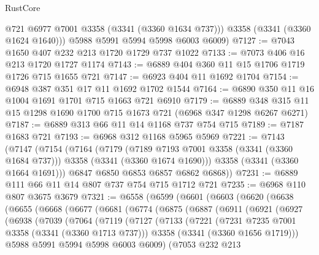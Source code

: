 \begin{lexlean}{RustCore}
\begin{coremodule}
          @721
          @6977
          @7001
          @3358
          (@3341 (@3360 @1634 @737)))
        @3358
        (@3341 (@3360 @1624 @1640)))
      @5988
      @5991
      @5994
      @5998
      @6003
      @6009)
@7127 := @7043 @1650 @407 @232 @213 @1720 @1729 @737 @1022
@7133 := @7073 @406 @16 @213 @1720 @1727 @1174
@7143 := @6889 @404 @360 @11 @15 @1706 @1719 @1726 @715 @1655 @721
@7147 := @6923 @404 @11 @1692 @1704
@7154 := @6948 @387 @351 @17 @11 @1692 @1702 @1544
@7164 := @6890 @350 @11 @16 @1004 @1691 @1701 @715 @1663 @721 @6910
@7179 := @6889 @348 @315 @11 @15 @1298 @1690 @1700 @715 @1673 @721 (@6968 @347 @1298 @6267 @6271)
@7187 := @6889 @313 @66 @11 @14 @1168 @737 @754 @715
@7189 := @7187 @1683 @721
@7193 := @6968 @312 @1168 @5965 @5969
@7221 := @7143
    (@7147
      (@7154
        (@7164
          (@7179
            (@7189 @7193 @7001 @3358 (@3341 (@3360 @1684 @737)))
            @3358
            (@3341 (@3360 @1674 @1690)))
          @3358
          (@3341 (@3360 @1664 @1691)))
        @6847
        @6850
        @6853
        @6857
        @6862
        @6868))
@7231 := @6889 @111 @66 @11 @14 @807 @737 @754 @715 @1712 @721
@7235 := @6968 @110 @807 @3675 @3679
@7321 := @6558
    (@6599
      (@6601
        (@6603
          (@6620
            (@6638
              (@6655
                (@6668
                  (@6677
                    (@6681
                      (@6774
                        (@6875
                          (@6887
                            (@6911
                              (@6921
                                (@6927
                                  (@6938
                                    (@7039
                                      (@7064
                                        (@7119
                                          (@7127
                                            (@7133
                                              (@7221
                                                (@7231 @7235 @7001 @3358 (@3341 (@3360 @1713 @737)))
                                                @3358
                                                (@3341 (@3360 @1656 @1719)))
                                              @5988
                                              @5991
                                              @5994
                                              @5998
                                              @6003
                                              @6009)
                                            (@7053
                                              @232
                                              @213

\end{coremodule}
\end{lexlean}
